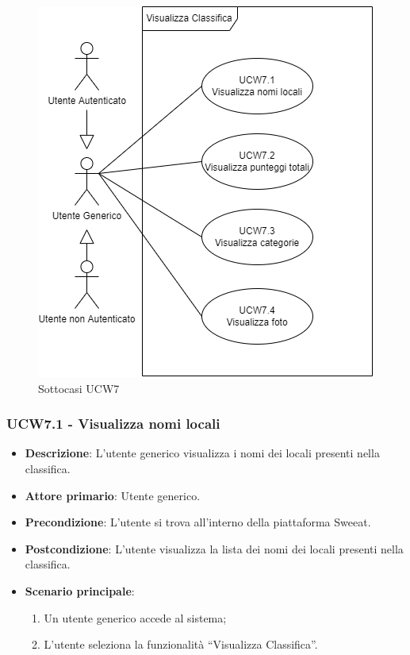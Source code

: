\begin{figure}[!h]
    \centering
        \includegraphics[scale=0.5]{UC_images/UCW7-1.png}
        \caption{Sottocasi UCW7}
\end{figure}

\subsubsection{UCW7.1 - Visualizza nomi locali}
\begin{itemize}
	\item \textbf{Descrizione}: L'utente generico visualizza i nomi dei locali presenti nella classifica.
    \item \textbf{Attore primario}: Utente generico.
    \item \textbf{Precondizione}: L’utente si trova all’interno della piattaforma Sweeat.
    \item \textbf{Postcondizione}: L’utente visualizza la lista dei nomi dei locali presenti nella classifica.
    \item \textbf{Scenario principale}: 
    \begin{enumerate}
        \item Un utente generico accede al sistema;
        \item L’utente seleziona la funzionalità “Visualizza Classifica”.
    \end{enumerate}
\end{itemize}

